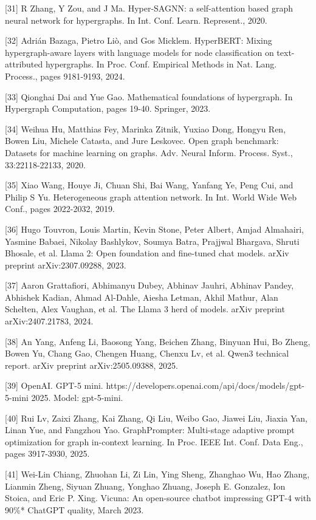 \documentclass[10pt]{article}
\begin{document}
{[}31{]} R Zhang, Y Zou, and J Ma. Hyper-SAGNN: a self-attention based graph neural network for hypergraphs. In Int. Conf. Learn. Represent., 2020.

{[}32{]} Adrián Bazaga, Pietro Liò, and Gos Micklem. HyperBERT: Mixing hypergraph-aware layers with language models for node classification on text-attributed hypergraphs. In Proc. Conf. Empirical Methods in Nat. Lang. Process., pages 9181-9193, 2024.

{[}33{]} Qionghai Dai and Yue Gao. Mathematical foundations of hypergraph. In Hypergraph Computation, pages 19-40. Springer, 2023.

{[}34{]} Weihua Hu, Matthias Fey, Marinka Zitnik, Yuxiao Dong, Hongyu Ren, Bowen Liu, Michele Catasta, and Jure Leskovec. Open graph benchmark: Datasets for machine learning on graphs. Adv. Neural Inform. Process. Syst., 33:22118-22133, 2020.

{[}35{]} Xiao Wang, Houye Ji, Chuan Shi, Bai Wang, Yanfang Ye, Peng Cui, and Philip S Yu. Heterogeneous graph attention network. In Int. World Wide Web Conf., pages 2022-2032, 2019.

{[}36{]} Hugo Touvron, Louis Martin, Kevin Stone, Peter Albert, Amjad Almahairi, Yasmine Babaei, Nikolay Bashlykov, Soumya Batra, Prajjwal Bhargava, Shruti Bhosale, et al. Llama 2: Open foundation and fine-tuned chat models. arXiv preprint arXiv:2307.09288, 2023.

{[}37{]} Aaron Grattafiori, Abhimanyu Dubey, Abhinav Jauhri, Abhinav Pandey, Abhishek Kadian, Ahmad Al-Dahle, Aiesha Letman, Akhil Mathur, Alan Schelten, Alex Vaughan, et al. The Llama 3 herd of models. arXiv preprint arXiv:2407.21783, 2024.

{[}38{]} An Yang, Anfeng Li, Baosong Yang, Beichen Zhang, Binyuan Hui, Bo Zheng, Bowen Yu, Chang Gao, Chengen Huang, Chenxu Lv, et al. Qwen3 technical report. arXiv preprint arXiv:2505.09388, 2025.

{[}39{]} OpenAI. GPT-5 mini. https://developers.openai.com/api/docs/models/gpt-5-mini 2025. Model: gpt-5-mini.

{[}40{]} Rui Lv, Zaixi Zhang, Kai Zhang, Qi Liu, Weibo Gao, Jiawei Liu, Jiaxia Yan, Linan Yue, and Fangzhou Yao. GraphPrompter: Multi-stage adaptive prompt optimization for graph in-context learning. In Proc. IEEE Int. Conf. Data Eng., pages 3917-3930, 2025.

{[}41{]} Wei-Lin Chiang, Zhuohan Li, Zi Lin, Ying Sheng, Zhanghao Wu, Hao Zhang, Lianmin Zheng, Siyuan Zhuang, Yonghao Zhuang, Joseph E. Gonzalez, Ion Stoica, and Eric P. Xing. Vicuna: An open-source chatbot impressing GPT-4 with 90\%* ChatGPT quality, March 2023.
\end{document}
